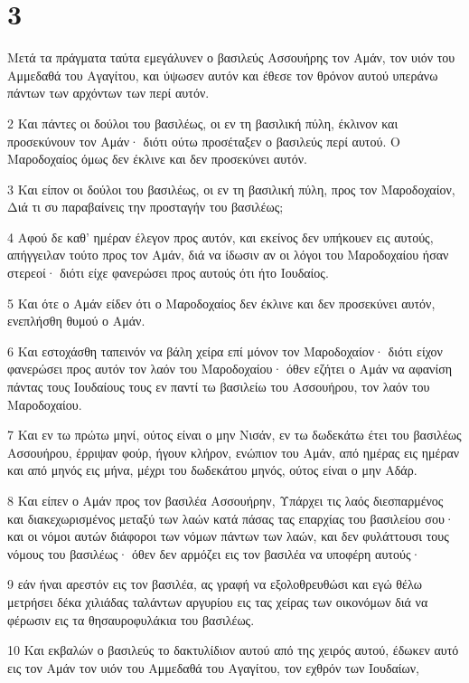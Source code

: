 \chapter{3}

\par Μετά τα πράγματα ταύτα εμεγάλυνεν ο βασιλεύς Ασσουήρης τον Αμάν, τον υιόν του Αμμεδαθά του Αγαγίτου, και ύψωσεν αυτόν και έθεσε τον θρόνον αυτού υπεράνω πάντων των αρχόντων των περί αυτόν.
\par 2 Και πάντες οι δούλοι του βασιλέως, οι εν τη βασιλική πύλη, έκλινον και προσεκύνουν τον Αμάν· διότι ούτω προσέταξεν ο βασιλεύς περί αυτού. Ο Μαροδοχαίος όμως δεν έκλινε και δεν προσεκύνει αυτόν.
\par 3 Και είπον οι δούλοι του βασιλέως, οι εν τη βασιλική πύλη, προς τον Μαροδοχαίον, Διά τι συ παραβαίνεις την προσταγήν του βασιλέως;
\par 4 Αφού δε καθ' ημέραν έλεγον προς αυτόν, και εκείνος δεν υπήκουεν εις αυτούς, απήγγειλαν τούτο προς τον Αμάν, διά να ίδωσιν αν οι λόγοι του Μαροδοχαίου ήσαν στερεοί· διότι είχε φανερώσει προς αυτούς ότι ήτο Ιουδαίος.
\par 5 Και ότε ο Αμάν είδεν ότι ο Μαροδοχαίος δεν έκλινε και δεν προσεκύνει αυτόν, ενεπλήσθη θυμού ο Αμάν.
\par 6 Και εστοχάσθη ταπεινόν να βάλη χείρα επί μόνον τον Μαροδοχαίον· διότι είχον φανερώσει προς αυτόν τον λαόν του Μαροδοχαίου· όθεν εζήτει ο Αμάν να αφανίση πάντας τους Ιουδαίους τους εν παντί τω βασιλείω του Ασσουήρου, τον λαόν του Μαροδοχαίου.
\par 7 Και εν τω πρώτω μηνί, ούτος είναι ο μην Νισάν, εν τω δωδεκάτω έτει του βασιλέως Ασσουήρου, έρριψαν φούρ, ήγουν κλήρον, ενώπιον του Αμάν, από ημέρας εις ημέραν και από μηνός εις μήνα, μέχρι του δωδεκάτου μηνός, ούτος είναι ο μην Αδάρ.
\par 8 Και είπεν ο Αμάν προς τον βασιλέα Ασσουήρην, Υπάρχει τις λαός διεσπαρμένος και διακεχωρισμένος μεταξύ των λαών κατά πάσας τας επαρχίας του βασιλείου σου· και οι νόμοι αυτών διάφοροι των νόμων πάντων των λαών, και δεν φυλάττουσι τους νόμους του βασιλέως· όθεν δεν αρμόζει εις τον βασιλέα να υποφέρη αυτούς·
\par 9 εάν ήναι αρεστόν εις τον βασιλέα, ας γραφή να εξολοθρευθώσι και εγώ θέλω μετρήσει δέκα χιλιάδας ταλάντων αργυρίου εις τας χείρας των οικονόμων διά να φέρωσιν εις τα θησαυροφυλάκια του βασιλέως.
\par 10 Και εκβαλών ο βασιλεύς το δακτυλίδιον αυτού από της χειρός αυτού, έδωκεν αυτό εις τον Αμάν τον υιόν του Αμμεδαθά του Αγαγίτου, τον εχθρόν των Ιουδαίων,
